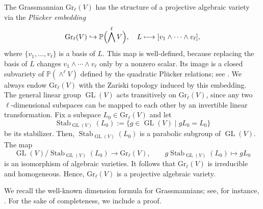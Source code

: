 \documentclass[a4,12pt]{amsart}
\numberwithin{equation}{section} %
\def\GL{\operatorname{GL}} %
\def\Stab{\operatorname{Stab}} %
\def\Gr{\mathrm{Gr}} %
\theoremstyle{definition} %
\begin{document}
The Grassmannian $\Gr_\ell(V)$ has the structure of a projective algebraic variety via the \emph{Pl\"ucker embedding}
\[
\Gr_\ell(V) \hookrightarrow \mathbb{P}\Bigl(\bigwedge^{\ell} V\Bigr),\quad
L \longmapsto [v_1\wedge\cdots\wedge v_{\ell}],
\]
where $\{v_1,\dots,v_{\ell}\}$ is a basis of $L$. This map is well-defined, because replacing the basis of $L$ changes $v_1\wedge\cdots\wedge v_{\ell}$ only by a nonzero scalar. Its image is a closed subvariety of $\mathbb{P}(\wedge^{\ell}V)$ defined by the quadratic Pl\"ucker relations; see \cite[Theorem 5.2.3]{LB-Grassmannian-book}. We always endow $\Gr_\ell(V)$ with the Zariski topology induced by this embedding. The general linear group $\GL(V)$ acts transitively on $\Gr_\ell(V)$, since any two $\ell$-dimensional subspaces can be mapped to each other by an invertible linear transformation. Fix a subspace $L_0\in\Gr_\ell(V)$ and let
\[
\Stab_{\GL(V)}(L_0) := \{ g\in\GL(V) \mid gL_0 = L_0 \}
\]
be its stabilizer. Then, $\Stab_{\GL(V)}(L_0)$ is a parabolic subgroup of $\GL(V)$. The map
\[
\GL(V)/\Stab_{\GL(V)}(L_0) \longrightarrow \Gr_\ell(V),\qquad g\Stab_{\GL(V)}(L_0) \longmapsto gL_0
\]
is an isomorphism of algebraic varieties. It follows that $\Gr_\ell(V)$ is irreducible and homogeneous. Hence, $\Gr_\ell(V)$ is a projective algebraic variety. 

We recall the well-known dimension formula for Grassmannians; see, for instance, \cite[Corollary 5.3.8]{LB-Grassmannian-book}. For the sake of completeness, we include a proof. 
\end{document}
